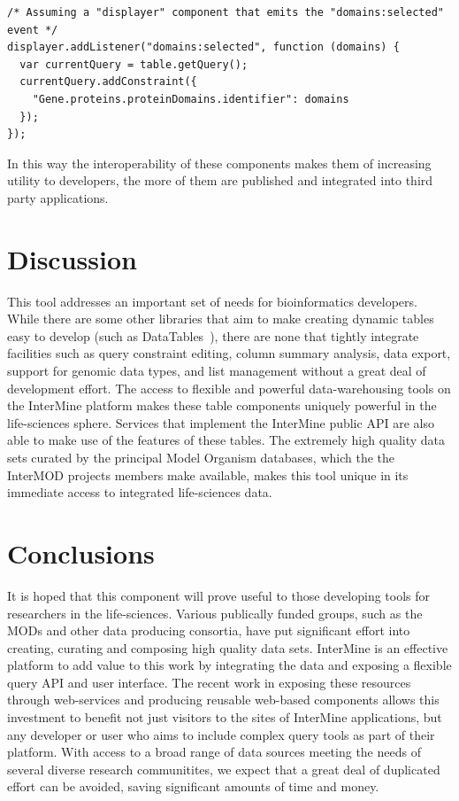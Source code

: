 \documentclass[10pt,a4paper,twocolumn]{article}
\begin{document}
\begin{lstlisting}[caption={Integrating with Other Components - Example 2}, label={code:modify-query}]
/* Assuming a "displayer" component that emits the "domains:selected" event */
displayer.addListener("domains:selected", function (domains) {
  var currentQuery = table.getQuery();
  currentQuery.addConstraint({
    "Gene.proteins.proteinDomains.identifier": domains
  });
});
\end{lstlisting}

In this way the interoperability of these components makes them of increasing
utility to developers, the more of them are published and integrated into third
party applications.

\section*{Discussion}

This tool addresses an important set of needs for bioinformatics developers.
While there are some other libraries that aim to make creating dynamic tables
easy to develop (such as DataTables~\cite{site:datatables}), there are none that
tightly integrate facilities such as query constraint editing, column summary
analysis, data export, support for genomic data types, and list management
without a great deal of development effort. The access to flexible and powerful
data-warehousing tools on the InterMine platform makes these table components
uniquely powerful in the life-sciences sphere. Services that implement the
InterMine public API are also able to make use of the features of these tables.
The extremely high quality data sets curated by the principal Model Organism
databases, which the the InterMOD projects members make available, makes this
tool unique in its immediate access to integrated life-sciences data. 

\section*{Conclusions}

It is hoped that this component will prove useful to those developing tools for
researchers in the life-sciences. Various publically funded groups, such as the
MODs and other data producing consortia, have put significant effort into
creating, curating and composing high quality data sets. InterMine is an
effective platform to add value to this work by integrating the data and
exposing a flexible query API and user interface. The recent work in exposing
these resources through web-services and producing reusable web-based components
allows this investment to benefit not just visitors to the sites of InterMine
applications, but any developer or user who aims to include complex query tools
as part of their platform. With access to a broad range of data sources meeting
the needs of several diverse research communitites, we expect that a great deal
of duplicated effort can be avoided, saving significant amounts of time and
money.
\end{document}
